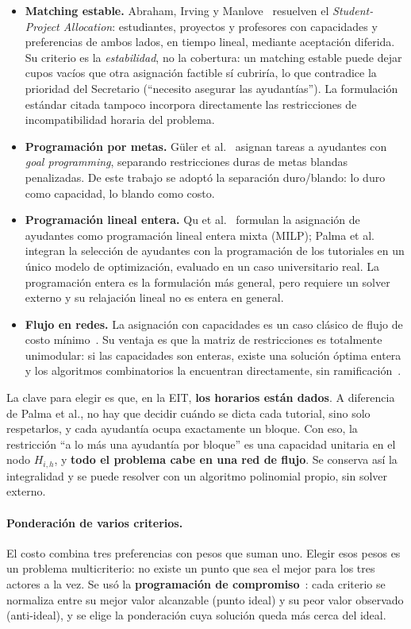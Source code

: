 \documentclass{article}
\begin{document}
\begin{itemize}
    \item \textbf{Matching estable.} Abraham, Irving y Manlove~\cite{abraham2007spa} resuelven el \textit{Student-Project Allocation}: estudiantes, proyectos y profesores con capacidades y preferencias de ambos lados, en tiempo lineal, mediante aceptación diferida. Su criterio es la \emph{estabilidad}, no la cobertura: un matching estable puede dejar cupos vacíos que otra asignación factible sí cubriría, lo que contradice la prioridad del Secretario (``necesito asegurar las ayudantías''). La formulación estándar citada tampoco incorpora directamente las restricciones de incompatibilidad horaria del problema.
    \item \textbf{Programación por metas.} Güler et al.~\cite{guler2015ta} asignan tareas a ayudantes con \textit{goal programming}, separando restricciones duras de metas blandas penalizadas. De este trabajo se adoptó la separación duro/blando: lo duro como capacidad, lo blando como costo.
    \item \textbf{Programación lineal entera.} Qu et al.~\cite{qu2017ta} formulan la asignación de ayudantes como programación lineal entera mixta (MILP); Palma et al.~\cite{palma2025uta} integran la selección de ayudantes con la programación de los tutoriales en un único modelo de optimización, evaluado en un caso universitario real. La programación entera es la formulación más general, pero requiere un solver externo y su relajación lineal no es entera en general.
    \item \textbf{Flujo en redes.} La asignación con capacidades es un caso clásico de flujo de costo mínimo~\cite{ahuja1993}. Su ventaja es que la matriz de restricciones es totalmente unimodular: si las capacidades son enteras, existe una solución óptima entera y los algoritmos combinatorios la encuentran directamente, sin ramificación~\cite{ahuja1993}.
\end{itemize}

La clave para elegir es que, en la EIT, \textbf{los horarios están dados}. A diferencia de Palma et al., no hay que decidir cuándo se dicta cada tutorial, sino solo respetarlos, y cada ayudantía ocupa exactamente un bloque. Con eso, la restricción ``a lo más una ayudantía por bloque'' es una capacidad unitaria en el nodo $H_{i,h}$, y \textbf{todo el problema cabe en una red de flujo}. Se conserva así la integralidad y se puede resolver con un algoritmo polinomial propio, sin solver externo.

\paragraph{Ponderación de varios criterios.} El costo combina tres preferencias con pesos que suman uno. Elegir esos pesos es un problema multicriterio: no existe un punto que sea el mejor para los tres actores a la vez. Se usó la \textbf{programación de compromiso}~\cite{zeleny1982}: cada criterio se normaliza entre su mejor valor alcanzable (punto ideal) y su peor valor observado (anti-ideal), y se elige la ponderación cuya solución queda más cerca del ideal.
\end{document}

